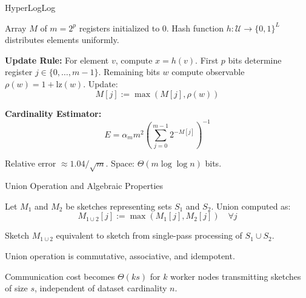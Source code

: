 \documentclass{beamer}
\begin{document}
\begin{frame}{HyperLogLog}

    \begin{definition}
        Array $M$ of $m=2^p$ registers initialized to 0. Hash function $h: \mathcal{U} \to \{0,1\}^L$ distributes elements uniformly.
    \end{definition}

    \textbf{Update Rule:} For element $v$, compute $x = h(v)$. First $p$ bits determine register $j \in \{0, \dots, m-1\}$. Remaining bits $w$ compute observable $\rho(w) = 1 + \text{lz}(w)$. Update:
    $$M[j] := \max(M[j], \rho(w))$$

    \textbf{Cardinality Estimator:}
    $$E = \alpha_m m^2 \left( \sum_{j=0}^{m-1} 2^{-M[j]} \right)^{-1}$$

    Relative error $\approx 1.04/\sqrt{m}$. Space: $\Theta(m \log\log n)$ bits.

\end{frame}

\begin{frame}{Union Operation and Algebraic Properties}

    \begin{definition}
        Let $M_1$ and $M_2$ be sketches representing sets $S_1$ and $S_2$. Union computed as:
        $$M_{1 \cup 2}[j] := \max(M_1[j], M_2[j]) \quad \forall j$$
    \end{definition}

    \begin{theorem}
        Sketch $M_{1 \cup 2}$ equivalent to sketch from single-pass processing of $S_1 \cup S_2$.
    \end{theorem}

    \begin{theorem}
        Union operation is commutative, associative, and idempotent.
    \end{theorem}

    Communication cost becomes $\Theta(ks)$ for $k$ worker nodes transmitting sketches of size $s$, independent of dataset cardinality $n$.

\end{frame}


\end{document}
